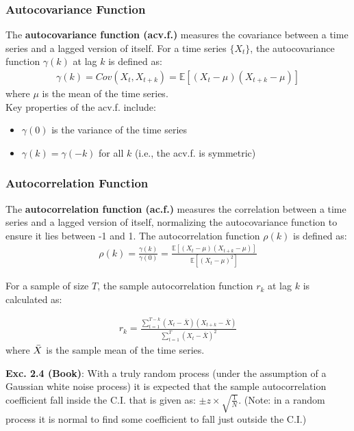 \subsubsection{Autocovariance Function}

The \textbf{autocovariance function (acv.f.)} measures the covariance between a time series and a lagged version of itself. For a time series $\{X_t\}$, the autocovariance function $\gamma(k)$ at lag $k$ is defined as:
\begin{align}
    \gamma(k)=Cov(X_t,X_{t+k})=\mathbb{E}\left[(X_t-\mu)(X_{t+k} -\mu) \right]
\end{align}
where $\mu$ is the mean of the time series.\\

Key properties of the acv.f. include:
\begin{itemize}
    \item $\gamma(0)$ is the variance of the time series
    \item $\gamma(k)=\gamma(-k)$ for all $k$ (i.e., the acv.f. is symmetric)
\end{itemize}

\subsubsection{Autocorrelation Function}

The \textbf{autocorrelation function (ac.f.)} measures the correlation between a time series and a lagged version of itself, normalizing the autocovariance function to ensure it lies between -1 and 1. The autocorrelation function $\rho(k)$ is defined as:
\begin{align}
    \rho(k)= \frac{\gamma(k)}{\gamma(0)}=\frac{\mathbb{E}[(X_t-\mu)(X_{t+k}-\mu)]}{\mathbb{E}[(X_t-\mu)^2]}
\end{align}

For a sample of size $T$, the sample autocorrelation function $r_k$ at lag $k$ is calculated as:

\begin{align}
    r_k=\frac{\sum_{t=1}^{T-k} (X_t-\bar{X})(X_{t+k}-\bar{X})}{\sum_{t=1}^{T} (X_t-\bar{X})^2}
\end{align}
where $\Bar{X}$ is the sample mean of the time series.


\textbf{Exc. 2.4 (Book)}: With a truly random process (under the assumption of a Gaussian white noise process) it is expected that the sample autocorrelation coefficient fall inside the C.I. that is given as: $\pm z\times \sqrt{\frac{1}{N}}$. (Note: in a random process it is normal to find some coefficient to fall just outside the C.I.)\\



